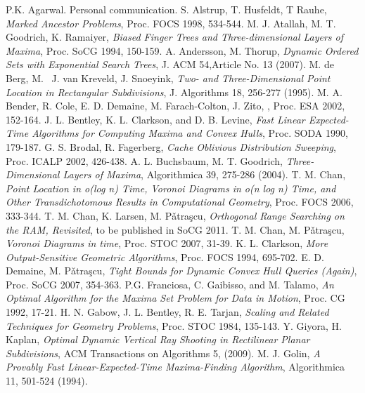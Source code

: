 \documentclass[10pt]{llncs}
\begin{document}
\begin{thebibliography}{99}
 P.K. Agarwal. Personal communication.
S. Alstrup, T. Husfeldt, T Rauhe, {\em Marked Ancestor Problems},
Proc.  FOCS 1998, 534-544.
M. J. Atallah, M. T. Goodrich,  K. Ramaiyer, {\em Biased Finger Trees and 
Three-dimensional Layers of Maxima}, Proc. SoCG 1994, 150-159.
A. Andersson, M. Thorup, {\em  Dynamic Ordered Sets with Exponential Search Trees}, J. ACM 54,Article No. 13 (2007).
M. de Berg, M.~ J. van Kreveld, J. Snoeyink,  {\em Two- and Three-Dimensional Point Location in Rectangular Subdivisions}, J. Algorithms 18,  256-277 (1995).
M. A. Bender, R. Cole, E. D. Demaine, M. Farach-Colton, J. Zito,
,
\newblock Proc.   ESA 2002, 152-164.
J. L. Bentley, K. L. Clarkson, and D. B. Levine,
{\em  Fast Linear Expected-Time Algorithms for Computing Maxima and
Convex Hulls}, Proc. SODA 1990, 179-187.
G. S. Brodal, R. Fagerberg, {\em Cache Oblivious Distribution Sweeping},
Proc.  ICALP 2002, 426-438.
A. L. Buchsbaum, M. T. Goodrich, {\em Three-Dimensional Layers of Maxima},
 Algorithmica 39, 275-286 (2004).
T. M. Chan, {\em Point Location in o(log n) Time, Voronoi Diagrams in o(n log n) Time, and Other Transdichotomous Results in Computational Geometry},
Proc. FOCS 2006,  333-344.
T. M. Chan, K. Larsen, M. P\v{a}tra\c{s}cu,
{\em Orthogonal Range Searching on the RAM, Revisited},
to be published in SoCG 2011. 
T. M. Chan, M. P\v{a}tra\c{s}cu, {\em Voronoi Diagrams in  
time}, Proc.  STOC 2007, 31-39.
K. L. Clarkson, {\em More Output-Sensitive Geometric Algorithms}, 
 Proc. FOCS 1994, 695-702.
E. D. Demaine, M. P\v{a}tra\c{s}cu, {\em Tight Bounds for Dynamic Convex Hull Queries (Again)}, Proc. SoCG 2007, 354-363.
P.G. Franciosa, C. Gaibisso, and M. Talamo, {\em  An Optimal Algorithm for the Maxima Set Problem for Data in Motion},  Proc. CG 1992, 17-21.
H. N. Gabow, J. L. Bentley, R. E. Tarjan, {\em Scaling and Related Techniques for Geometry Problems}, Proc.  STOC 1984, 135-143.
 Y. Giyora, H. Kaplan,
{\em  Optimal Dynamic Vertical Ray Shooting in Rectilinear Planar 
Subdivisions},  ACM Transactions on Algorithms 5, (2009).
M. J. Golin,
{\em  A Provably Fast Linear-Expected-Time Maxima-Finding Algorithm},
 Algorithmica 11, 501-524 (1994).

\end{thebibliography}
\end{document}
